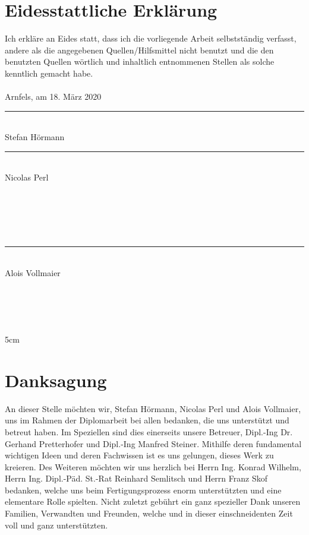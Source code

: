 \frontmatter												%
\addtocounter{page}{2}

\newcommand{\doublesignature}[2]{%
  \parbox{\textwidth}{
    \hfill
    \parbox{7cm}{
      \centering
      \rule{6cm}{1pt}\\
      #1
    }
    \parbox{7cm}{
      \centering
      \rule{6cm}{1pt}\\
      #2
    }
  }
  \mbox{}\\
  \mbox{}\\
  \mbox{}\\
  \mbox{}\\
}
\newcommand{\singlesignature}[2]{%
  \parbox{\textwidth}{
    \hfill
    \parbox{7cm}{
      \centering
      \rule{6cm}{1pt}\\
      #1
    }
  }
  \mbox{}\\
  \mbox{}\\
  \mbox{}\\
  \mbox{}\\
}

\vspace*{20pt}

\section*{Eidesstattliche Erklärung}
\label{sec:eidesstattliche-erklaerung}
Ich erkläre an Eides statt, dass ich die vorliegende Arbeit selbstständig verfasst, andere als die angegebenen
Quellen/Hilfsmittel nicht benutzt und die den benutzten Quellen wörtlich und inhaltlich entnommenen
Stellen als solche kenntlich gemacht habe.\\
\\
Arnfels, am 18. März 2020\\

\vskip 1cm

\doublesignature{Stefan Hörmann}{Nicolas Perl}
\singlesignature{Alois Vollmaier}

\vskip 5cm

\clearpage

\newpage
\thispagestyle{empty}
\mbox{}

\clearpage

\section*{Danksagung}
\label{sec:danksagung}
An dieser Stelle möchten wir, Stefan Hörmann, Nicolas Perl und Alois Vollmaier, uns im Rahmen der Diplomarbeit bei allen bedanken, die uns unterstützt und betreut haben.
Im Speziellen sind dies einerseits unsere Betreuer, Dipl.-Ing Dr. Gerhand Pretterhofer und Dipl.-Ing Manfred Steiner.
Mithilfe deren fundamental wichtigen Ideen und deren Fachwissen ist es uns gelungen, dieses Werk zu kreieren.
Des Weiteren möchten wir uns herzlich bei Herrn Ing. Konrad Wilhelm, Herrn Ing. Dipl.-Päd. St.-Rat Reinhard Semlitsch und Herrn Franz Skof bedanken, welche uns beim Fertigungsprozess enorm unterstützten und eine elementare Rolle spielten.
Nicht zuletzt gebührt ein ganz spezieller Dank unseren Familien, Verwandten und Freunden, welche und in dieser einschneidenten Zeit voll und ganz unterstützten.
\clearpage

